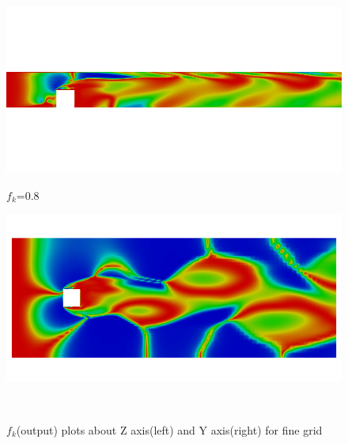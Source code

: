  
\begin{figure}[H]
\begin{minipage}[b]{0.5\linewidth}
\includegraphics[scale=0.25]{figure/fine/eight/fkout_z.png}
\caption*{$f_k$=0.8}
\end{minipage}
\begin{minipage}[b]{0.5\linewidth}
\includegraphics[scale=0.25]{figure/fine/eight/fkout_y.png}
\caption*{}
\end{minipage}\\
\caption{$f_k$(output) plots about Z axis(left) and Y axis(right) for fine grid}
\label{fig:eight}
\end{figure}
